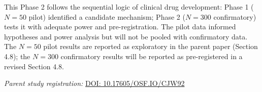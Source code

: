\documentclass[11pt]{article}
\begin{document}
This Phase 2 follows the sequential logic of clinical drug development: Phase 1 ($N=50$ pilot) identified a candidate mechanism; Phase 2 ($N=300$ confirmatory) tests it with adequate power and pre-registration. The pilot data informed hypotheses and power analysis but will not be pooled with confirmatory data. The $N=50$ pilot results are reported as exploratory in the parent paper (Section 4.8); the $N=300$ confirmatory results will be reported as pre-registered in a revised Section 4.8.

\vfill

\small\noindent\textit{Parent study registration:} \href{https://doi.org/10.17605/OSF.IO/CJW92}{DOI: 10.17605/OSF.IO/CJW92}
\end{document}
